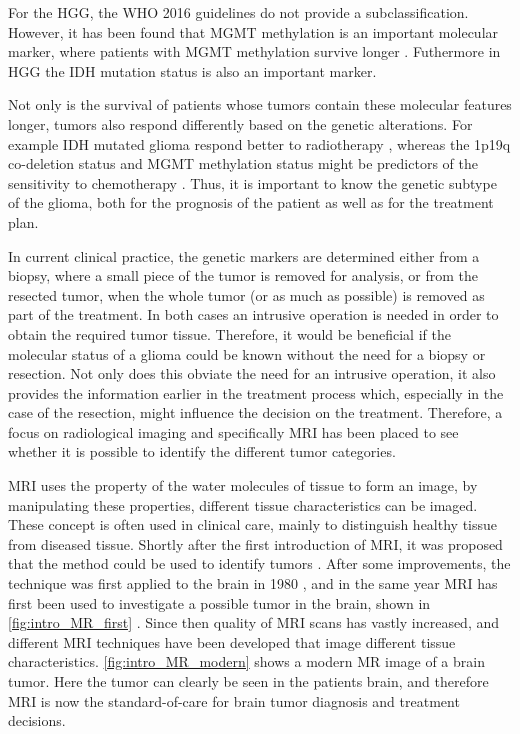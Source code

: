 For the \gls{HGG}, the WHO 2016 guidelines do not provide a subclassification.
However, it has been found that \gls{MGMT} methylation is an important molecular marker, where patients with \gls{MGMT} methylation survive longer \autocite{martinez2007MGMT, gessler2018MGMT}.
Futhermore in \gls{HGG} the \gls{IDH} mutation status is also an important marker.

Not only is the survival of patients whose tumors contain these molecular features longer, tumors also respond differently based on the genetic alterations.
For example \gls{IDH} mutated glioma respond better to radiotherapy \autocite{juratli2015IDHtreatment}, whereas the 1p19q co-deletion status and MGMT methylation status might be predictors of the sensitivity to chemotherapy \autocite{idbaih2007markersresponse}.
Thus, it is important to know the genetic subtype of the glioma, both for the prognosis of the patient as well as for the treatment plan.

In current clinical practice, the genetic markers are determined either from a biopsy, where a small piece of the tumor is removed for analysis, or from the resected tumor, when the whole tumor (or as much as possible) is removed as part of the treatment.
In both cases an intrusive operation is needed in order to obtain the required tumor tissue.
Therefore, it would be beneficial if the molecular status of a glioma could be known without the need for a biopsy or resection.
Not only does this obviate the need for an intrusive operation, it also provides the information earlier in the treatment process which, especially in the case of the resection, might influence the decision on the treatment.
Therefore, a focus on radiological imaging and specifically \gls{MRI} has been placed to see whether it is possible to identify the different tumor categories.

\gls{MRI} uses the property of the water molecules of tissue to form an image, by manipulating these properties, different tissue characteristics can be imaged.
These concept is often used in clinical care, mainly to distinguish healthy tissue from diseased tissue.
Shortly after the first introduction of \gls{MRI}, it was proposed that the method could be used to identify tumors \autocite{damadian1971tumor}.
After some improvements, the technique was first applied to the brain in 1980 \autocite{holland1980brain}, and in the same year MRI has first been used to investigate a possible tumor in the brain, shown in \cref{fig:intro_MR_first} \autocite{hawkes1980NMRbrain}.
Since then quality of \gls{MRI} scans has vastly increased, and different \gls{MRI} techniques have been developed that image different tissue characteristics.
\cref{fig:intro_MR_modern} shows a modern \gls{MR} image of a brain tumor.
Here the tumor can clearly be seen in the patients brain, and therefore \gls{MRI} is now the standard-of-care for brain tumor diagnosis and treatment decisions.

